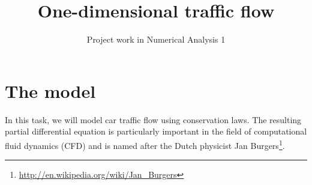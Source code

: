 \documentclass[a4paper,10pt]{article}
\title{\bf One-dimensional traffic flow}
\author{Project work in Numerical Analysis 1}
\begin{document}
\maketitle
{}


\section*{The model}
In this task, we will model car traffic flow using conservation laws. The resulting partial differential equation is particularly important in the field of computational fluid dynamics (CFD) and is named after the Dutch physicist Jan Burgers\footnote{\href{http://en.wikipedia.org/wiki/Jan_Burgers}{http://en.wikipedia.org/wiki/Jan\_Burgers}}.
\end{document}
